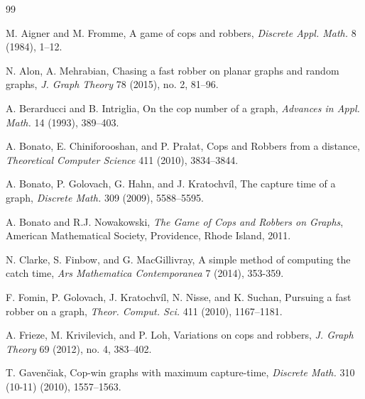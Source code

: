 \documentclass[12pt]{amsart}
\theoremstyle{definition}
\begin{document}
\begin{thebibliography}{99}

 M. Aigner and M. Fromme, A game of cops and robbers, \textit{Discrete Appl. Math.} 8 (1984), 1--12.


 N. Alon, A. Mehrabian, Chasing a fast robber on planar graphs and random graphs, \textit{J. Graph Theory} 78 (2015), no. 2, 81--96.


 A. Berarducci and B. Intriglia, On the cop number of a graph, \textit{Advances in Appl. Math.} 14 (1993), 389--403.

 A. Bonato, E. Chiniforooshan, and P. Pra\l{}at, Cops and Robbers from a distance, \textit{Theoretical Computer Science} 411 (2010), 3834--3844.

 A. Bonato, P. Golovach, G. Hahn, and J. Kratochv\'{i}l, The capture time of a graph, \textit{Discrete Math.} 309 (2009), 5588--5595.

 A. Bonato and R.J. Nowakowski, \textit{The Game of Cops and Robbers on Graphs}, American Mathematical Society, Providence, Rhode Island, 2011.

 N. Clarke, S. Finbow, and G. MacGillivray, A simple method of computing the catch time, \textit{Ars Mathematica Contemporanea} 7 (2014), 353-359.

 F. Fomin, P. Golovach, J. Kratochv\'{i}l, N. Nisse, and K. Suchan, Pursuing a fast robber on a graph, \textit{Theor. Comput. Sci.} 411 (2010), 1167--1181.

 A. Frieze, M. Krivilevich, and P. Loh, Variations on cops and robbers, \textit{J. Graph Theory} 69 (2012), no. 4, 383--402.

 T. Gaven\v{c}iak, Cop-win graphs with maximum capture-time, \textit{Discrete Math.} 310 (10-11) (2010), 1557--1563.



\end{thebibliography}
\end{document}
